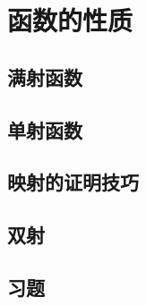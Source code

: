 \section{函数的性质}

\subsection{满射函数}

\subsection{单射函数}

\subsection{映射的证明技巧}

\subsection{双射}

\subsection{习题}